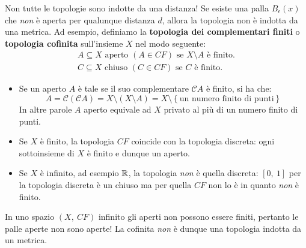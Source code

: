 \begin{attention}
	Non tutte le topologie sono indotte da una distanza! Se esiste una palla $B_\epsilon\left(x\right)$ che \textit{non} è aperta per qualunque distanza $d$, allora la topologia non è indotta da una metrica. Ad esempio, definiamo la \textbf{topologia dei complementari finiti} o \textbf{topologia cofinita} sull'insieme $X$ nel modo seguente:
	\begin{gather*}
		A\subseteq X \text{ aperto } \left(A\in CF\right) \text{ se }  X\setminus A \text{ è finito.}\\
		C\subseteq X \text{ chiuso } \left(C\in CF\right) \text{ se }  C \text{ è finito.}
	\end{gather*}
	\begin{itemize}
		\item Se un aperto $A$ è tale se il suo complementare $\mathcal{C}A$ è finito, si ha che:
		\begin{equation}
			A=\mathcal{C}\left(\mathcal{C}A\right)=X\setminus\left(X\setminus A\right)=X\setminus\left\{\text{un numero finito di punti}\right\}
		\end{equation}
		In altre parole $A$ aperto equivale ad $X$ privato al più di un numero finito di punti.
		\item Se $X$ è finito, la topologia $CF$ coincide con la topologia discreta: ogni sottoinsieme di $X$ è finito e dunque un aperto.
		\item Se $X$ è infinito, ad esempio $\mathbb{R}$, la topologia \textit{non} è quella discreta: $[0,\ 1]$ per la topologia discreta è un chiuso ma per quella $CF$ non lo è in quanto \textit{non} è finito.
	\end{itemize}
In uno spazio $\left(X,\ CF\right)$ infinito gli aperti non possono essere finiti, pertanto le palle aperte non sono aperte! La cofinita \textit{non} è dunque una topologia indotta da un metrica.
\end{attention}
